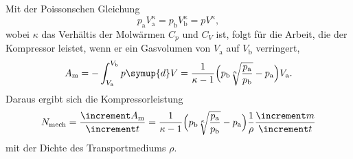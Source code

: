 Mit der Poissonschen Gleichung
\begin{equation}
  p_\text{a}V_\text{a}^\kappa = p_\text{b}V_\text{b}^\kappa = pV^\kappa,
  \label{eqn:Poisson}
\end{equation}
wobei $\kappa$ das Verhältis der Molwärmen $C_p$ und $C_V$ ist,
folgt für die Arbeit, die der Kompressor leistet, wenn er ein Gasvolumen von
$V_\text{a}$ auf $V_\text{b}$ verringert,
\begin{equation}
  A_\text{m} = - \int_{V_\text{a}}^{V_\text{b}} p \symup{d}V =
  \frac{1}{\kappa - 1} \Bigl(p_\text{b} \sqrt[\kappa]{\frac{p_\text{a}}
  {p_\text{b}}} - p_\text{a} \Bigr) V_\text{a}.
\end{equation}
Daraus ergibt sich die Kompressorleistung
\begin{equation}
  N_\text{mech} = \frac{\increment A_\text{m}}{\increment t} =
  \frac{1}{\kappa - 1} \Bigl(p_\text{b} \sqrt[\kappa]{\frac{p_\text{a}}
  {p_\text{b}}} - p_\text{a} \Bigr) \frac{1}{\rho} \frac{\increment m}
  {\increment t}
\end{equation}
mit der Dichte des Transportmediums $\rho$.
